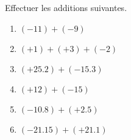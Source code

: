 
\begin{exercice}\label{exo2smath-0216}

Effectuer les additions suivantes.
\begin{multicols}{2}
    \begin{enumerate}
        \item
$(-11) + (-9 )$
        \item
$ (+1) + (+3)+(-2)$
        \item
$ (+25.2) +(-15.3)$
        \item
$ (+12) + (-15)$
        \item
$ (-10.8) + (+2.5)$
        \item
$ (-21.15)+ (+21.1)$
    \end{enumerate}
\end{multicols}

\end{exercice}
